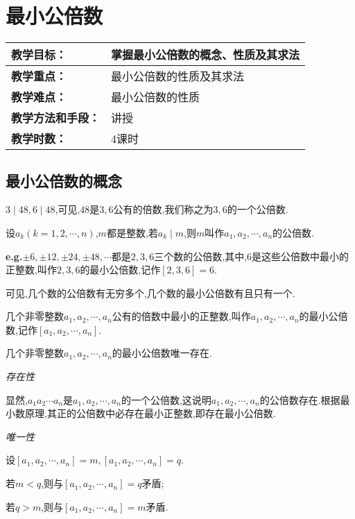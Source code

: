 \section{最小公倍数}
\begin{table}[htb]
	\centering  
	\begin{tabular}{p{32mm}|p{95.6mm}}
		\hline 
		\textbf{教学目标：}       & 掌握最小公倍数的概念、性质及其求法  \\ \hline
		\textbf{教学重点：}       & 最小公倍数的性质及其求法 \\ \hline
		\textbf{教学难点：}       & 最小公倍数的性质\\ \hline
		\textbf{教学方法和手段：} & 讲授  \\ \hline
		\textbf{教学时数：}       & 4课时 \\ \hline
	\end{tabular}
\end{table}
\subsection{最小公倍数的概念}

$3\mid 48,6\mid 48$,可见,$48$是$3,6$公有的倍数,我们称之为$3,6$的一个公倍数.

 设$a_{k}(k=1,2,\cdots,n)$,$m$都是整数,若$a_{k}\mid m$,则$m$叫作$a_{1},a_{2},\cdots,a_{n}$的公倍数.

\textbf{e.g.}$\pm 6,\pm 12,\pm 24,\pm 48,\cdots$都是$2,3,6$三个数的公倍数,其中,$6$是这些公倍数中最小的正整数,叫作$2,3,6$的最小公倍数,记作$[2,3,6]=6$.

可见,几个数的公倍数有无穷多个,几个数的最小公倍数有且只有一个.

 几个非零整数$a_{1},a_{2},\cdots,a_{n}$公有的倍数中最小的正整数,叫作$a_{1},a_{2},\cdots,a_{n}$的最小公倍数,记作$[a_{1},a_{2},\cdots,a_{n}]$.

\theorem 几个非零整数$a_{1},a_{2},\cdots,a_{n}$的最小公倍数唯一存在.

\proof \textit{存在性}

显然,$a_{1}a_{2}\cdots a_{n}$是$a_{1},a_{2},\cdots,a_{n}$的一个公倍数,这说明$a_{1},a_{2},\cdots,a_{n}$的公倍数存在.根据最小数原理,其正的公倍数中必存在最小正整数,即存在最小公倍数.

\textit{唯一性}

设$[a_{1},a_{2},\cdots,a_{n}]=m,[a_{1},a_{2},\cdots,a_{n}]=q$.

若$m<q$,则与$[a_{1},a_{2},\cdots,a_{n}]=q$矛盾;

若$q>m$,则与$[a_{1},a_{2},\cdots,a_{n}]=m$矛盾.

